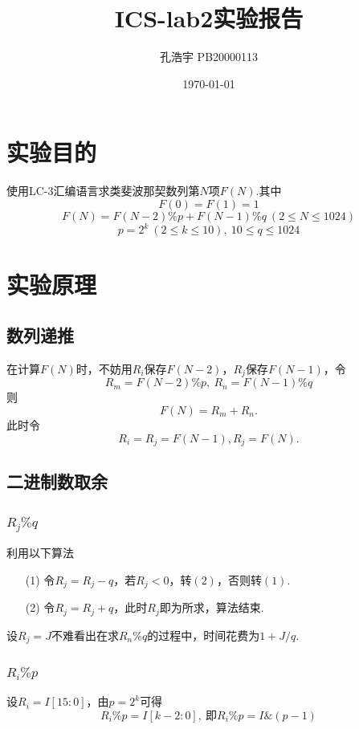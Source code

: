 \documentclass[UTF8]{ctexart}
\title{ICS-lab2实验报告}
\author{孔浩宇 PB20000113}
\date{\today}
\begin{document}
\fancyfoot[C]{\thepage}

\maketitle
\tableofcontents
\newpage

\section{实验目的}
    使用LC-3汇编语言求类斐波那契数列第$N$项$F(N)$.其中
    \[
        F(0) = F(1) = 1
    \]
    \[
        F(N) = F(N-2)\% p + F(N-1)\% q \ (2\leq N\leq 1024)
    \]
    \[
        p=2^k\ (2\leq k\leq 10),\ 10\leq q\leq 1024
    \]

\section{实验原理}
    \subsection{数列递推}
    在计算$F(N)$时，不妨用$R_i$保存$F(N-2)$，$R_j$保存$F(N-1)$，令
    \[
        R_m = F(N-2)\%p ,\ R_n = F(N-1)\%q  
    \]
    则
    \[
        F(N) = R_m + R_n.
    \]
    此时令
    \[
        R_i = R_j = F(N-1) , R_j = F(N).
    \]
    \subsection{二进制数取余}
        \subsubsection{$R_j \% q$}
        利用以下算法
        \begin{enumerate}
            \item [(1)]令$R_j = R_j - q$，若$R_j < 0 $，转$(2)$，否则转$(1)$.
            \item [(2)]令$R_j = R_j + q$，此时$R_j$即为所求，算法结束.
        \end{enumerate}
        设$R_j = J$不难看出在求$R_n \% q$的过程中，时间花费为$1+ J/q$.
        
        \subsubsection{$R_i \% p$}
        设$R_i = I[15:0]$，由$p=2^k$可得
        \[
            R_i \% p = I[k-2:0],\ \mbox{即}
            R_i \% p = I \& (p-1)
        \]
\end{document}
